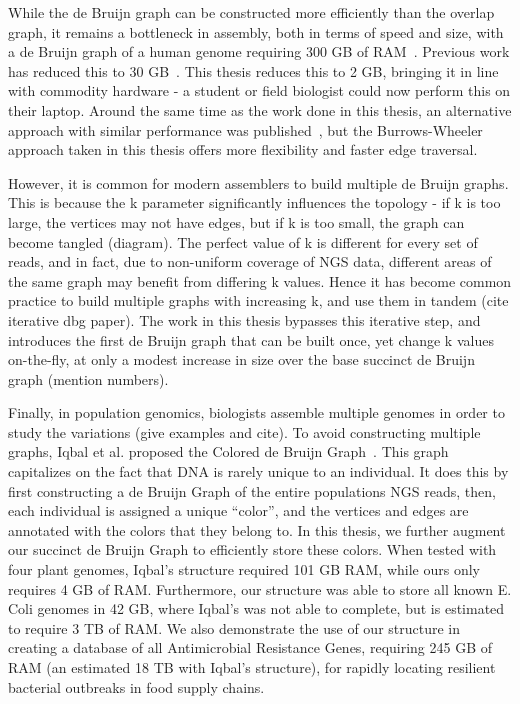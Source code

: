 While the de Bruijn graph can be constructed more efficiently than the overlap graph, it remains a bottleneck in assembly, both in terms of speed and size, with a de Bruijn graph of a human genome requiring 300 GB of RAM~\cite{Simpson:2009}. Previous work has reduced this to 30 GB~\cite{Conway}. This thesis reduces this to 2 GB, bringing it in line with commodity hardware - a student or field biologist could now perform this on their laptop. Around the same time as the work done in this thesis, an alternative approach with similar performance was published~\cite{wabi}, but the Burrows-Wheeler approach taken in this thesis offers more flexibility and faster edge traversal.

However, it is common for modern assemblers to build multiple de Bruijn graphs. This is because the k parameter significantly influences the topology - if k is too large, the vertices may not have edges, but if k is too small, the graph can become tangled (diagram). The perfect value of k is different for every set of reads, and in fact, due to non-uniform coverage of NGS data, different areas of the same graph may benefit from differing k values. Hence it has become common practice to build multiple graphs with increasing k, and use them in tandem (cite iterative dbg paper). The work in this thesis bypasses this iterative step, and introduces the first de Bruijn graph that can be built once, yet change k values on-the-fly, at only a modest increase in size over the base succinct de Bruijn graph (mention numbers).

Finally, in population genomics, biologists assemble multiple genomes in order to study the variations (give examples and cite). To avoid constructing multiple graphs, Iqbal et al. proposed the Colored de Bruijn Graph~\cite{ICTFM12}. This graph capitalizes on the fact that DNA is rarely unique to an individual. It does this by first constructing a de Bruijn Graph of the entire populations NGS reads, then, each individual is assigned a unique “color”, and the vertices and edges are annotated with the colors that they belong to. In this thesis, we further augment our succinct de Bruijn Graph to efficiently store these colors. When tested with four plant genomes, Iqbal’s structure required 101 GB RAM, while ours only requires 4 GB of RAM. Furthermore, our structure was able to store all known E. Coli genomes in 42 GB, where Iqbal’s was not able to complete, but is estimated to require 3 TB of RAM. We also demonstrate the use of our structure in creating a database of all Antimicrobial Resistance Genes, requiring 245 GB of RAM (an estimated 18 TB with Iqbal’s structure), for rapidly locating resilient bacterial outbreaks in food supply chains.

